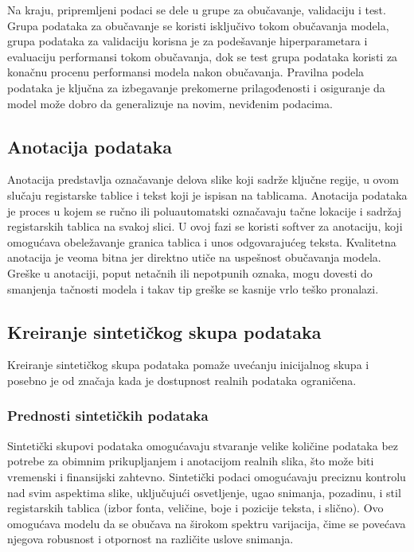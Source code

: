 \documentclass[a4paper,12pt]{article}
\begin{document}
	Na kraju, pripremljeni podaci se dele u grupe za obučavanje, validaciju i test. Grupa podataka za obučavanje se koristi isključivo tokom obučavanja modela, grupa podataka za validaciju korisna je za podešavanje hiperparametara i evaluaciju performansi tokom obučavanja, dok se test grupa podataka koristi za konačnu procenu performansi modela nakon obučavanja. Pravilna podela podataka je ključna za izbegavanje prekomerne prilagođenosti i osiguranje da model može dobro da generalizuje na novim, neviđenim podacima.
	
	\subsection{Anotacija podataka}
	Anotacija predstavlja označavanje delova slike koji sadrže ključne regije, u ovom slučaju registarske tablice i tekst koji je ispisan na tablicama. Anotacija podataka je proces u kojem se ručno ili poluautomatski označavaju tačne lokacije i sadržaj registarskih tablica na svakoj slici. U ovoj fazi se koristi softver za anotaciju, koji omogućava obeležavanje granica tablica i unos odgovarajućeg teksta. Kvalitetna anotacija je veoma bitna jer direktno utiče na uspešnost obučavanja modela. Greške u anotaciji, poput netačnih ili nepotpunih oznaka, mogu dovesti do smanjenja tačnosti modela i takav tip greške se kasnije vrlo teško pronalazi.
	
	\subsection{Kreiranje sintetičkog skupa podataka}
	Kreiranje sintetičkog skupa podataka pomaže uvećanju inicijalnog skupa i posebno je od značaja kada je dostupnost realnih podataka ograničena.
	
	\subsubsection{Prednosti sintetičkih podataka}
	Sintetički skupovi podataka omogućavaju stvaranje velike količine podataka bez potrebe za obimnim prikupljanjem i anotacijom realnih slika, što može biti vremenski i finansijski zahtevno. Sintetički podaci omogućavaju preciznu kontrolu nad svim aspektima slike, uključujući osvetljenje, ugao snimanja, pozadinu, i stil registarskih tablica (izbor fonta, veličine, boje i pozicije teksta, i slično). Ovo omogućava modelu da se obučava na širokom spektru varijacija, čime se povećava njegova robusnost i otpornost na različite uslove snimanja.
	
\end{document}
